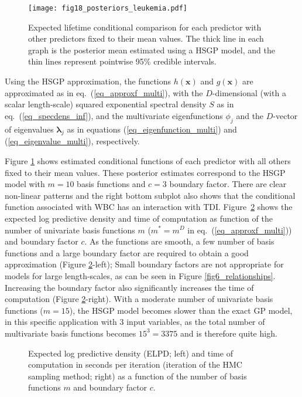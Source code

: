 %
\begin{figure}
\centering
\texttt{[image: fig18\_posteriors\_leukemia.pdf]}
\caption{Expected lifetime conditional comparison for each predictor with other predictors fixed to their mean values. The thick line in each graph is the posterior mean estimated using a HSGP model, and the thin lines represent pointwise 95\% credible intervals.}
  \label{fig18_posteriors_leukemia}
\end{figure}

Using the HSGP approximation, the functions $h(\bm{x})$ and $g(\bm{x})$ are approximated as in eq.~(\ref{eq_approxf_multi}), with the $D$-dimensional (with a scalar length-scale) squared exponential spectral density $S$ as in eq.~(\ref{eq_specdens_inf}), and the multivariate eigenfunctions $\phi_j$ and the $D$-vector of eigenvalues $\bm{\lambda}_j$ as in equations (\ref{eq_eigenfunction_multi}) and  (\ref{eq_eigenvalue_multi}), respectively.

Figure \ref{fig18_posteriors_leukemia} shows estimated conditional functions of each predictor with all others fixed to their mean values. These posterior estimates correspond to the HSGP model with $m=10$ basis functions and $c=3$ boundary factor. There are clear  non-linear patterns and the right bottom subplot also shows that the conditional function associated with WBC has an interaction with TDI.
Figure~\ref{fig19_elpd_leukemia} shows the expected log predictive density \citep[ELPD; ][]{vehtari_2012,Vehtari+Gelman+Gabry:2017_practical} and time of computation as function of the number of univariate basis functions $m$ ($m^{\ast}=m^D$ in eq.~(\ref{eq_approxf_multi})) and boundary factor $c$. As the functions are smooth, a few number of basis functions and a large boundary factor are required to obtain a good approximation (Figure \ref{fig19_elpd_leukemia}-left); Small boundary factors are not appropriate for models for large length-scales, as can be seen in Figure \ref{fig6_relationships}. Increasing the boundary factor also significantly increases the time of computation (Figure \ref{fig19_elpd_leukemia}-right). With a moderate number of univariate basis functions ($m=15$), the HSGP model becomes slower than the exact GP model, in this specific application with $3$ input variables, as the total number of multivariate basis functions becomes $15^3 = 3375$ and is therefore quite high. 
%
\begin{figure}
\centering
{} 
\caption{Expected log predictive density (ELPD; left) and time of computation in seconds per iteration (iteration of the HMC sampling method; right) as a function of the number of basis functions $m$ and boundary factor $c$.}
  \label{fig19_elpd_leukemia}
\end{figure}

